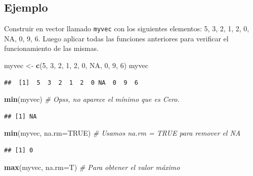 \documentclass[10pt,]{krantz}
\makeatletter
\newenvironment{Shaded}{\begin{snugshade}}{\end{snugshade}}
\newcommand{\KeywordTok}[1]{\textcolor[rgb]{0.13,0.29,0.53}{\textbf{#1}}}
\newcommand{\DataTypeTok}[1]{\textcolor[rgb]{0.13,0.29,0.53}{#1}}
\newcommand{\DecValTok}[1]{\textcolor[rgb]{0.00,0.00,0.81}{#1}}
\newcommand{\StringTok}[1]{\textcolor[rgb]{0.31,0.60,0.02}{#1}}
\newcommand{\CommentTok}[1]{\textcolor[rgb]{0.56,0.35,0.01}{\textit{#1}}}
\newcommand{\OtherTok}[1]{\textcolor[rgb]{0.56,0.35,0.01}{#1}}
\newcommand{\NormalTok}[1]{#1}
\newenvironment{kframe}{%
\medskip{}
\setlength{\fboxsep}{.8em}
 \def\at@end@of@kframe{}%
 \ifinner\ifhmode%
  \def\at@end@of@kframe{\end{minipage}}%
  \begin{minipage}{\columnwidth}%
 \fi\fi%
 \def\FrameCommand##1{\hskip\@totalleftmargin \hskip-\fboxsep
 \colorbox{shadecolor}{##1}\hskip-\fboxsep
     \hskip-\linewidth \hskip-\@totalleftmargin \hskip\columnwidth}%
 \MakeFramed {\advance\hsize-\width
   \@totalleftmargin\z@ \linewidth\hsize
   \@setminipage}}%
 {\par\unskip\endMakeFramed%
 \at@end@of@kframe}
\renewenvironment{Shaded}{\begin{kframe}}{\end{kframe}}
\makeatother
\begin{document}
\subsection*{Ejemplo}\label{ejemplo-9}


Construir en vector llamado \texttt{myvec} con los siguientes elementos:
5, 3, 2, 1, 2, 0, NA, 0, 9, 6. Luego aplicar todas las funciones
anteriores para verificar el funcionamiento de las mismas.

\begin{Shaded}
\begin{Highlighting}[]
\NormalTok{myvec <-}\StringTok{ }\KeywordTok{c}\NormalTok{(}\DecValTok{5}\NormalTok{, }\DecValTok{3}\NormalTok{, }\DecValTok{2}\NormalTok{, }\DecValTok{1}\NormalTok{, }\DecValTok{2}\NormalTok{, }\DecValTok{0}\NormalTok{, }\OtherTok{NA}\NormalTok{, }\DecValTok{0}\NormalTok{, }\DecValTok{9}\NormalTok{, }\DecValTok{6}\NormalTok{)}
\NormalTok{myvec}
\end{Highlighting}
\end{Shaded}

\begin{verbatim}
##  [1]  5  3  2  1  2  0 NA  0  9  6
\end{verbatim}

\begin{Shaded}
\begin{Highlighting}[]
\KeywordTok{min}\NormalTok{(myvec)  }\CommentTok{# Opss, no aparece el mínimo que es Cero.}
\end{Highlighting}
\end{Shaded}

\begin{verbatim}
## [1] NA
\end{verbatim}

\begin{Shaded}
\begin{Highlighting}[]
\KeywordTok{min}\NormalTok{(myvec, }\DataTypeTok{na.rm=}\OtherTok{TRUE}\NormalTok{)  }\CommentTok{# Usamos na.rm = TRUE para remover el NA}
\end{Highlighting}
\end{Shaded}

\begin{verbatim}
## [1] 0
\end{verbatim}

\begin{Shaded}
\begin{Highlighting}[]
\KeywordTok{max}\NormalTok{(myvec, }\DataTypeTok{na.rm=}\NormalTok{T)  }\CommentTok{# Para obtener el valor máximo}
\end{Highlighting}
\end{Shaded}
\end{document}
